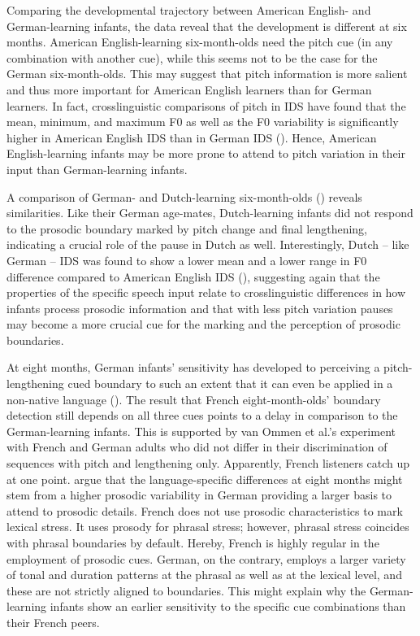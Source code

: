 \documentclass[output=paper]{langscibook}
\begin{document}
Comparing the developmental trajectory between American English- and Ger\-man-learn\-ing infants, the data reveal that the development is different at six months. American English-learning six-month-olds need the pitch cue (in any combination with another cue), while this seems not to be the case for the German six-month-olds. This may suggest that pitch information is more salient and thus more important for American English learners than for German learners. In fact, crosslinguistic comparisons of pitch in IDS have found that the mean, minimum, and maximum F0 as well as the F0 variability is significantly higher in American English IDS than in German IDS (\citealt{Fernald1984, Fernald1989}). Hence, American English-learning infants may be more prone to attend to pitch variation in their input than German-learning infants.

\begin{sloppypar}
A comparison of German- and Dutch-learning six-month-olds (\citealt{Johnson2008}) reveals similarities. Like their German age-mates, Dutch-learning infants did not respond to the prosodic boundary marked by pitch change and final lengthening, indicating a crucial role of the pause in Dutch as well. Interestingly, Dutch – like German – IDS was found to show a lower mean and a lower range in F0 difference compared to American English IDS (\citealt{Fernald1989, Weijer1997}), suggesting again that the properties of the specific speech input relate to crosslinguistic differences in how infants process prosodic information and that with less pitch variation pauses may become a more crucial cue for the marking and the perception of prosodic boundaries.
\end{sloppypar}

At eight months, German infants’ sensitivity has developed to perceiving a pitch-lengthening cued boundary to such an extent that it can even be applied in a non-native language (\citealt{VanOmmen2020}). The result that French eight-month-olds’ boundary detection still depends on all three cues points to a delay in comparison to the German-learning infants. This is supported by van Ommen et al.’s experiment with French and German adults who did not differ in their discrimination of sequences with pitch and lengthening only. Apparently, French listeners catch up at one point. \citet{VanOmmen2020} argue that the language-specific differences at eight months might stem from a higher prosodic variability in German providing a larger basis to attend to prosodic details. French does not use prosodic characteristics to mark lexical stress. It uses prosody for phrasal stress; however, phrasal stress coincides with phrasal boundaries by default. Hereby, French is highly regular in the employment of prosodic cues. German, on the contrary, employs a larger variety of tonal and duration patterns at the phrasal as well as at the lexical level, and these are not strictly aligned to boundaries. This might explain why the German-learning infants show an earlier sensitivity to the specific cue combinations than their French peers.
\end{document}

